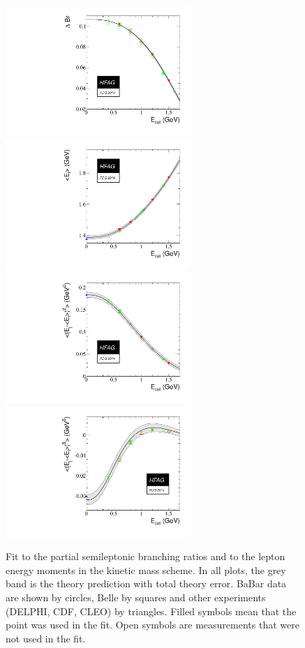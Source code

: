 \begin{figure}
\begin{center}
  \includegraphics[width=7cm]{figures/slb/e0_1.pdf}
  \includegraphics[width=7cm]{figures/slb/e1_1.pdf}\\
  \includegraphics[width=7cm]{figures/slb/e2_1.pdf}
  \includegraphics[width=7cm]{figures/slb/e3_1.pdf}
\end{center}
\caption{Fit to the partial semileptonic branching ratios and to the
  lepton energy moments in the kinetic mass scheme. In all plots, the
  grey band is the theory prediction with total theory error. BaBar
  data are shown by circles, Belle by squares and other experiments
  (DELPHI, CDF, CLEO) by triangles. Filled symbols mean that the point
  was used in the fit. Open symbols are measurements that were not
  used in the fit.} \label{fig:gf_res_kin_el}
\end{figure}
